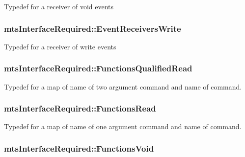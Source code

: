 Typedef for a receiver of void events \hypertarget{classmts_interface_required_af63cf75357e16f0e1ae862d9abaadbe3}{
\subsubsection[{Event\-Receivers\-Write}]{ mts\-Interface\-Required\-::\-Event\-Receivers\-Write\hspace{0.3cm}{\ttfamily [protected]}}}\label{classmts_interface_required_af63cf75357e16f0e1ae862d9abaadbe3}
Typedef for a receiver of write events \hypertarget{classmts_interface_required_abd2e0b70299b9a9a51cb7f3443d1364b}{
\subsubsection[{Functions\-Qualified\-Read}]{ mts\-Interface\-Required\-::\-Functions\-Qualified\-Read\hspace{0.3cm}{\ttfamily [protected]}}}\label{classmts_interface_required_abd2e0b70299b9a9a51cb7f3443d1364b}
Typedef for a map of name of two argument command and name of command. \hypertarget{classmts_interface_required_a0bbaaa1a252a893b921a02c61febf597}{
\subsubsection[{Functions\-Read}]{ mts\-Interface\-Required\-::\-Functions\-Read\hspace{0.3cm}{\ttfamily [protected]}}}\label{classmts_interface_required_a0bbaaa1a252a893b921a02c61febf597}
Typedef for a map of name of one argument command and name of command. \hypertarget{classmts_interface_required_ab2250cb695e1b187d6b4bbcc3a6cd73d}{
\subsubsection[{Functions\-Void}]{ mts\-Interface\-Required\-::\-Functions\-Void\hspace{0.3cm}{\ttfamily [protected]}}}\label{classmts_interface_required_ab2250cb695e1b187d6b4bbcc3a6cd73d}
